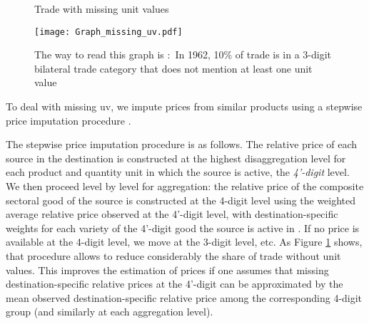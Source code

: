 \documentclass[12pt,twoside,a4paper,notitlepage]{article}
\begin{document}
\begin{figure}
\caption{Trade with missing unit values}
\texttt{[image: Graph\_missing\_uv.pdf]}
\label{fig:missing_uv}
\caption*{The way to read this graph is : In 1962, 10\% of trade is in a 3-digit bilateral trade category that does not mention at least one unit value}
\end{figure}




To deal with missing uv, we impute prices from similar products using a stepwise price imputation procedure
.

The stepwise price imputation procedure is as follows. The relative price of each source in the destination is constructed at the highest disaggregation level for each product and quantity unit in which the source is active, the \textit{4'-digit} level. We then proceed level by level for aggregation: the relative price of the composite sectoral good of the source is constructed at the 4-digit level using the weighted average relative price observed at the 4'-digit level, with destination-specific weights for each variety of the 4'-digit good the source is active in%
. If no price is available at the 4-digit level, we move at the 3-digit level, etc. As Figure \ref{fig:missing_uv} shows, that procedure allows to reduce considerably the share of trade without unit values. This improves the estimation of prices if one assumes that missing destination-specific relative prices at the 4'-digit can be approximated by the mean observed destination-specific relative price among the corresponding 4-digit group (and similarly at each aggregation level). 
\end{document}
